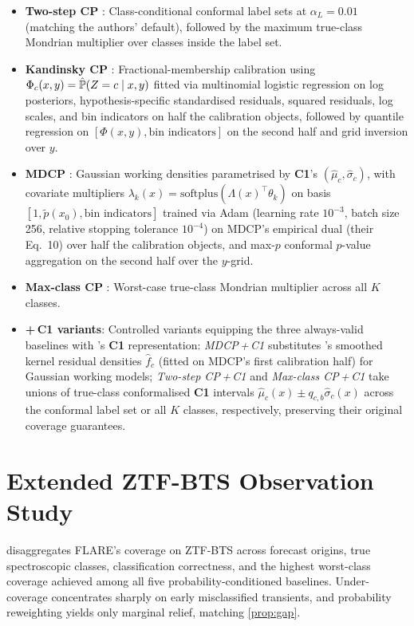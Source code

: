 \begin{itemize}
\item \textbf{Two-step CP} \citep{timans2024adaptive}: Class-conditional conformal label sets at $\alpha_L=0.01$ (matching the authors' default), followed by the maximum true-class Mondrian multiplier over classes inside the label set.
\item \textbf{Kandinsky CP} \citep{bairaktari2025kandinsky}: Fractional-membership calibration using $\Phi_c(x,y)=\hat\P(Z=c\mid x,y)$ fitted via multinomial logistic regression on log posteriors, hypothesis-specific standardised residuals, squared residuals, log scales, and bin indicators on half the calibration objects, followed by quantile regression on $[\Phi(x,y),\text{bin indicators}]$ on the second half and grid inversion over $y$.
\item \textbf{MDCP} \citep{yang2026multi}: Gaussian working densities parametrised by \textbf{C1}'s $(\hat\mu_c,\hat\sigma_c)$, with covariate multipliers $\lambda_k(x)=\mathrm{softplus}(\Lambda(x)^\top\theta_k)$ on basis $[1,\tilde p(x_0),\text{bin indicators}]$ trained via Adam (learning rate $10^{-3}$, batch size 256, relative stopping tolerance $10^{-4}$) on MDCP's empirical dual (their Eq.~10) over half the calibration objects, and max-$p$ conformal $p$-value aggregation on the second half over the $y$-grid.
\item \textbf{Max-class CP} \citep{barber2021limits}: Worst-case true-class Mondrian multiplier across all $K$ classes.
\item \textbf{+\,C1 variants}: Controlled variants equipping the three always-valid baselines with \gamut{}'s \textbf{C1} representation: \emph{MDCP\,+\,C1} substitutes \gamut{}'s smoothed kernel residual densities $\hat f_c$ (fitted on MDCP's first calibration half) for Gaussian working models; \emph{Two-step CP\,+\,C1} and \emph{Max-class CP\,+\,C1} take unions of true-class conformalised \textbf{C1} intervals $\hat\mu_c(x)\pm q_{c,b}\hat\sigma_c(x)$ across the conformal label set or all $K$ classes, respectively, preserving their original coverage guarantees.
\end{itemize}

\FloatBarrier
\section{Extended ZTF-BTS Observation Study}
\label{app:observation}
 disaggregates FLARE's coverage on ZTF-BTS across forecast origins, true spectroscopic classes, classification correctness, and the highest worst-class coverage achieved among all five probability-conditioned baselines.
Under-coverage concentrates sharply on early misclassified transients, and probability reweighting yields only marginal relief, matching \cref{prop:gap}.


